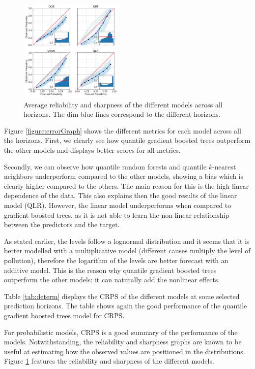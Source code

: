 \documentclass[a4paper,twocolumn,5p]{elsarticle}
\begin{document}
\begin{figure}
  \centering
  \includegraphics[width=0.45\textwidth]{reliability_sharpness}
  \caption{\label{figure:rel_sharp}Average reliability and sharpness
    of the different models across all horizons. The dim blue lines
    correspond to the different horizons. }
\end{figure}

Figure \ref{figure:errorGraph} shows the different metrics for each
model across all the horizons. First, we clearly see how 
quantile gradient
boosted trees outperform the other models and displays better scores
for all metrics.

Secondly, we can observe how quantile random forests and 
quantile $k$-nearest
neighbors underperform compared to the other models, showing a bias
which is clearly higher compared to the others.  The main reason for
this is the high linear dependence of the data. This also explains
then the good results of the linear model (QLR).  However, the linear
model underperforms when compared to gradient boosted trees, as it is
not able to learn the non-linear relationship between the predictors
and the target.

As stated earlier, the \no levels follow a lognormal
distribution and it seems that it is better modelled with a
multiplicative model (different causes multiply the level of
pollution), therefore the logarithm of the \no levels
are better forecast with an additive model. 
This is the reason why
quantile gradient boosted trees outperform 
the other models: it can naturally
add the nonlinear effects.

Table \ref{tab:determ} displays the CRPS of the different models at
some selected prediction horizons. The table shows again the good
performance of the quantile 
gradient boosted trees model for CRPS.

For probabilistic models, CRPS is a good summary of the performance of
the models. Notwithstanding, the reliability and sharpness graphs are
known to be useful at estimating how the observed values are
positioned in the distributions.  Figure \ref{figure:rel_sharp}
features the reliability and sharpness of the different models.
\end{document}
